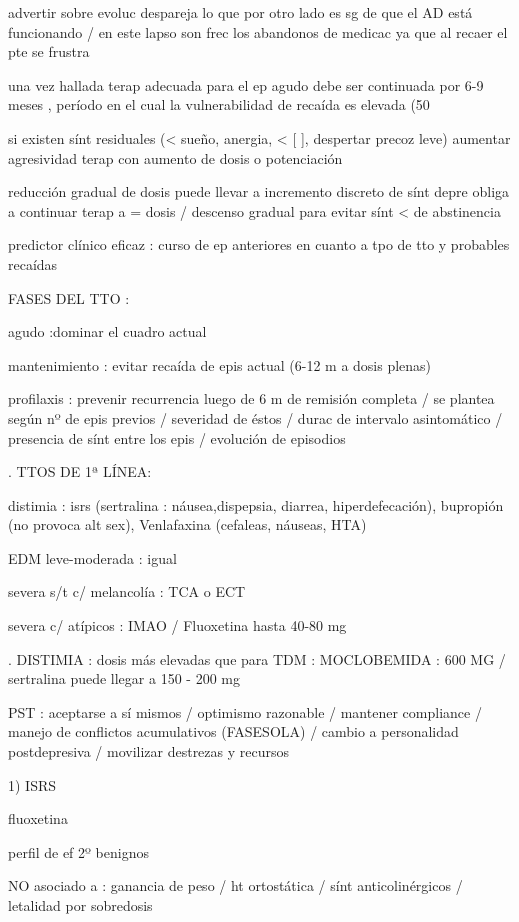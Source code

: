 \documentclass{scrbook}
\begin{document}
advertir sobre evoluc despareja lo que por otro lado es sg de que el AD está funcionando / en este lapso son frec los abandonos de medicac ya que al recaer el pte se frustra

una vez hallada terap adecuada para el ep agudo debe ser continuada por 6-9 meses , período en el cual la vulnerabilidad de recaída es elevada (50%

si existen sínt residuales (< sueño, anergia, < [ ], despertar precoz leve) aumentar agresividad terap con aumento de dosis o potenciación

reducción gradual de dosis puede llevar a incremento discreto de sínt depre obliga a continuar terap a = dosis / descenso gradual para evitar sínt < de abstinencia

predictor clínico eficaz : curso de ep anteriores en cuanto a tpo de tto y probables recaídas

FASES DEL TTO :

agudo :dominar el cuadro actual

mantenimiento : evitar recaída de epis actual (6-12 m a dosis plenas)

profilaxis : prevenir recurrencia luego de 6 m de remisión completa / se plantea según nº de epis previos / severidad de éstos / durac de intervalo asintomático / presencia de sínt entre los epis / evolución de episodios

. TTOS DE 1ª LÍNEA:

distimia : isrs (sertralina : náusea,dispepsia, diarrea, hiperdefecación), bupropión (no provoca alt sex), Venlafaxina (cefaleas, náuseas, HTA)

EDM leve-moderada : igual

severa s/t c/ melancolía : TCA o ECT

severa c/ atípicos : IMAO / Fluoxetina hasta 40-80 mg

. DISTIMIA : dosis más elevadas que para TDM : MOCLOBEMIDA : 600 MG / sertralina puede llegar a 150 - 200 mg

PST : aceptarse a sí mismos / optimismo razonable / mantener compliance / manejo de conflictos acumulativos (FASESOLA) / cambio a personalidad postdepresiva / movilizar destrezas y recursos

1) ISRS

fluoxetina

perfil de ef 2º benignos

NO asociado a : ganancia de peso / ht ortostática / sínt anticolinérgicos / letalidad por sobredosis
\end{document}
